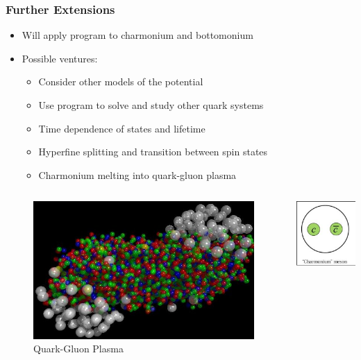 \documentclass[mathserif, 10pt,usenames,dvipsnames]{beamer}
\begin{document}
\begin{frame}
    \frametitle{Further Extensions}
    \begin{itemize}
        \item Will apply program to charmonium and bottomonium
        \item Possible ventures:
            \begin{itemize}
                \item Consider other models of the potential
                \item Use program to solve and study other quark systems
                \item Time dependence of states and lifetime
                \item Hyperfine splitting and transition between spin states 
                \item Charmonium melting into quark-gluon plasma
            \end{itemize}
    \end{itemize}
    \vspace{-20pt}
    \begin{columns}[c]
        \begin{center}
            \begin{figure}[H]
                \includegraphics[scale=0.3]{QGM.jpeg}
                \caption{\footnotesize Quark-Gluon Plasma}
            \end{figure}
        \end{center}
        \begin{center}
            \includegraphics[scale=0.35]{charm.png} \\

\end{center}
\end{columns}
\end{frame}
\end{document}
